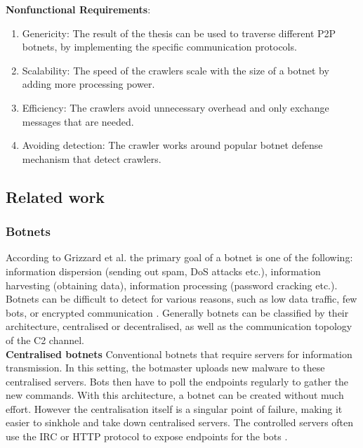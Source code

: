 \documentclass{article}
\begin{document}
\textbf{Nonfunctional Requirements}:
\begin{enumerate}
    \item Genericity: The result of the thesis can be used to traverse different P2P botnets, by implementing the specific communication protocols.
    \item Scalability: The speed of the crawlers scale with the size of a botnet by adding more processing power.
    \item Efficiency: The crawlers avoid unnecessary overhead and only exchange messages that are needed.
    \item Avoiding detection: The crawler works around popular botnet defense mechanism that detect crawlers.
\end{enumerate}

\subsection{Related work}

\subsubsection{Botnets}
According to Grizzard et al. \cite{grizzard2007peer} the primary goal of a botnet is one of the following: information dispersion (sending out spam, DoS attacks etc.), information harvesting (obtaining data), information processing (password cracking etc.).
Botnets can be difficult to detect for various reasons, such as low data traffic, few bots, or encrypted communication \cite{SurveyArchitectures}.
Generally botnets can be classified by their architecture, centralised or decentralised, as well as the communication topology of the C2 channel. \\

\textbf{Centralised botnets}  Conventional botnets that require servers for information transmission. In this setting, the botmaster uploads new malware to these centralised servers. Bots then have to poll the endpoints regularly to gather the new commands. With this architecture, a botnet can be created without much effort. However the centralisation itself is a singular point of failure, making it easier to sinkhole and take down centralised servers. The controlled servers often use the IRC or HTTP protocol to expose endpoints for the bots \cite{AMP2P}.
\end{document}
